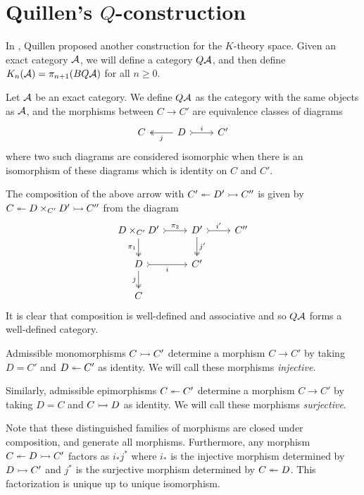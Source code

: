 \section{Quillen's $Q$-construction}\label{sec:Qconstruction}
In \cite{Quillen1973}, Quillen proposed another construction for the $K$-theory space.
Given an exact category $\mathcal{A}$, 
we will define a category $Q \mathcal{A}$, and then define $K_n(\mathcal{A}) = \pi_{n+1}(BQ\mathcal{A})$ for all $n \geq 0$.

\begin{definition}[$Q$-construction]
Let $\mathcal{A}$ be an exact category. We define $Q\mathcal{A}$ as the category with the same objects as $\mathcal{A}$, and the morphisms between $C \to C'$ are
equivalence classes of diagrams
\[
\begin{tikzcd}
C & D \arrow[l,two heads, "j"] \arrow[r,tail, "i"] & C'
\end{tikzcd}
\]
where two such diagrams are considered isomorphic when there is an isomorphism of these diagrams which is identity on $C$ and $C'$.

The composition of the above arrow with $C' \twoheadleftarrow D' \rightarrowtail C''$ is given by $C \twoheadleftarrow D \times_{C'} D' \rightarrowtail C''$ from the diagram
\[
\begin{tikzcd}%
D \times_{C'} D' \arrow[r, tail, "\pi_2"] \arrow[d, two heads, "\pi_1"'] & D' \arrow[r, tail, "i'"] \arrow[d, two heads, "j'"]& C''\\
D \arrow[r, tail, "i"'] \arrow[d, two heads, "j"'] & C'\\
C
\end{tikzcd}
\]
It is clear that composition is well-defined and associative and so $Q\mathcal{A}$ forms a well-defined category.
\end{definition}

\begin{remark}
Admissible monomorphisms $C \rightarrowtail C'$ determine a morphism $C \to C'$ by taking $D = C'$ and $D \twoheadleftarrow C'$ as identity.
We will call these morphisms \emph{injective}.

Similarly, admissible epimorphisms $C \twoheadleftarrow C'$ determine a morphism $C \to C'$ by taking $D = C$ and $C \rightarrowtail D$ as identity.
We will call these morphisms \emph{surjective}.

Note that these distinguished families of morphisms are closed under composition, and generate all morphisms.
Furthermore, any morphism $C \twoheadleftarrow D \rightarrowtail C'$ factors as $i_*j^*$ where
$i_*$ is the injective morphism determined by $D \rightarrowtail C'$ and $j^*$ is the surjective morphism determined by $C \twoheadleftarrow D$.
This factorization is unique up to unique isomorphism.
\end{remark}

